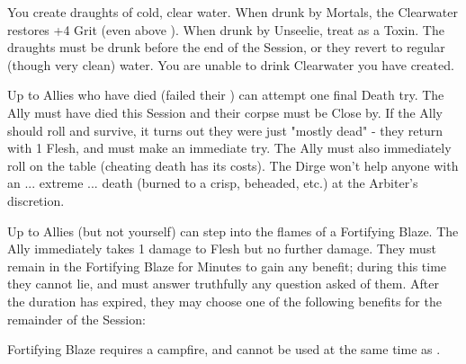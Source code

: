 \begin{multicols*}{2}
You create \DICE draughts of cold, clear water. When drunk by Mortals, the Clearwater restores +4 Grit (even above \MAX). When drunk by Unseelie, treat as a  Toxin. The draughts must be drunk before the end of the Session, or they revert to regular (though very clean) water. You are unable to drink Clearwater you have created.

\LITURGY [
  Name = Dirge,
  Link = arcana-mystery-dirge,
  Paradigm = J{\UmlautO}tnar,
  Duration = Session
]

Up to \DICE Allies who have died (failed their ) can attempt one final Death try. The Ally must have died this Session and their corpse must be Close by. If the Ally should roll and survive, it turns out they were just "mostly dead" - they return with 1 Flesh, and must make an immediate  try. The Ally must also immediately roll on the  table (cheating death has its costs). The Dirge won't help anyone with an ... extreme ... death (burned to a crisp, beheaded, etc.) at the Arbiter's discretion.



\LITURGY [
  Name = Fortifying Blaze,
  Link = arcana-mystery-fortifying-blaze,
  Paradigm = Righteous,
  Duration = Bivouac
]

Up to \DICE Allies (but not yourself) can step into the flames of a Fortifying Blaze. The Ally immediately takes 1 damage to Flesh but no further damage. They must remain in the Fortifying Blaze for Minutes to gain any benefit; during this time they cannot lie, and must answer truthfully any question asked of them.  After the duration has expired, they may choose one of the following benefits for the remainder of the Session:


Fortifying Blaze requires a campfire, and cannot be used at the same time as .



\end{multicols*}
